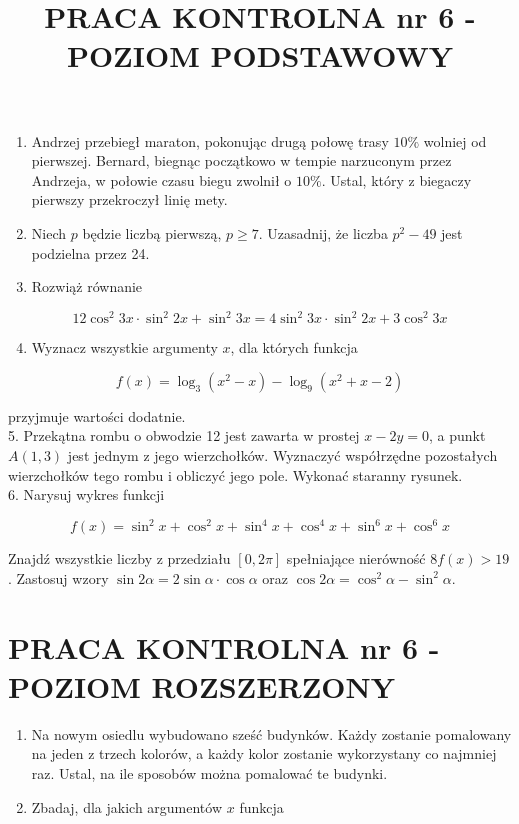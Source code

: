 \documentclass[10pt]{article}
\title{PRACA KONTROLNA nr 6 - POZIOM PODSTAWOWY }
\author{}
\date{}
\begin{document}
\maketitle
\begin{enumerate}
  \item Andrzej przebiegł maraton, pokonując drugą połowę trasy $10 \%$ wolniej od pierwszej. Bernard, biegnąc początkowo w tempie narzuconym przez Andrzeja, w połowie czasu biegu zwolnił o $10 \%$. Ustal, który z biegaczy pierwszy przekroczył linię mety.
  \item Niech $p$ będzie liczbą pierwszą, $p \geqslant 7$. Uzasadnij, że liczba $p^{2}-49$ jest podzielna przez 24.
  \item Rozwiąż równanie
\end{enumerate}

$$
12 \cos ^{2} 3 x \cdot \sin ^{2} 2 x+\sin ^{2} 3 x=4 \sin ^{2} 3 x \cdot \sin ^{2} 2 x+3 \cos ^{2} 3 x
$$

\begin{enumerate}
  \setcounter{enumi}{3}
  \item Wyznacz wszystkie argumenty $x$, dla których funkcja
\end{enumerate}

$$
f(x)=\log _{3}\left(x^{2}-x\right)-\log _{9}\left(x^{2}+x-2\right)
$$

przyjmuje wartości dodatnie.\\
5. Przekątna rombu o obwodzie 12 jest zawarta w prostej $x-2 y=0$, a punkt $A(1,3)$ jest jednym z jego wierzchołków. Wyznaczyć współrzędne pozostałych wierzchołków tego rombu i obliczyć jego pole. Wykonać staranny rysunek.\\
6. Narysuj wykres funkcji

$$
f(x)=\sin ^{2} x+\cos ^{2} x+\sin ^{4} x+\cos ^{4} x+\sin ^{6} x+\cos ^{6} x
$$

Znajdź wszystkie liczby z przedziału $[0,2 \pi]$ spełniające nierówność $8 f(x)>19$. Zastosuj wzory $\sin 2 \alpha=2 \sin \alpha \cdot \cos \alpha$ oraz $\cos 2 \alpha=\cos ^{2} \alpha-\sin ^{2} \alpha$.

\section*{PRACA KONTROLNA nr 6 - POZIOM ROZSZERZONY}
\begin{enumerate}
  \item Na nowym osiedlu wybudowano sześć budynków. Każdy zostanie pomalowany na jeden z trzech kolorów, a każdy kolor zostanie wykorzystany co najmniej raz. Ustal, na ile sposobów można pomalować te budynki.
  \item Zbadaj, dla jakich argumentów $x$ funkcja
\end{enumerate}
\end{document}
